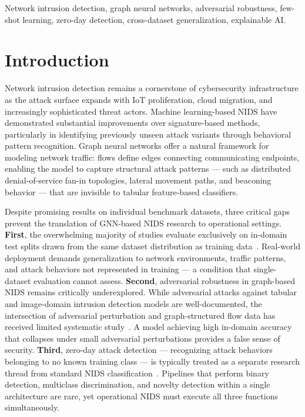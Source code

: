 \documentclass[compsoc,journal]{IEEEtran}
\begin{document}
\begin{keywords}
Network intrusion detection, graph neural networks, adversarial robustness, few-shot learning, zero-day detection, cross-dataset generalization, explainable AI.
\end{keywords}

\section{Introduction}

Network intrusion detection remains a cornerstone of cybersecurity infrastructure as the attack surface expands with IoT proliferation, cloud migration, and increasingly sophisticated threat actors. Machine learning-based NIDS have demonstrated substantial improvements over signature-based methods, particularly in identifying previously unseen attack variants through behavioral pattern recognition. Graph neural networks offer a natural framework for modeling network traffic: flows define edges connecting communicating endpoints, enabling the model to capture structural attack patterns — such as distributed denial-of-service fan-in topologies, lateral movement paths, and beaconing behavior — that are invisible to tabular feature-based classifiers.

Despite promising results on individual benchmark datasets, three critical gaps prevent the translation of GNN-based NIDS research to operational settings. \textbf{First}, the overwhelming majority of studies evaluate exclusively on in-domain test splits drawn from the same dataset distribution as training data~\cite{sarhan2021netflow,koroniotis2018botiot}. Real-world deployment demands generalization to network environments, traffic patterns, and attack behaviors not represented in training — a condition that single-dataset evaluation cannot assess. \textbf{Second}, adversarial robustness in graph-based NIDS remains critically underexplored. While adversarial attacks against tabular and image-domain intrusion detection models are well-documented, the intersection of adversarial perturbation and graph-structured flow data has received limited systematic study~\cite{arganids,structuraladv}. A model achieving high in-domain accuracy that collapses under small adversarial perturbations provides a false sense of security. \textbf{Third}, zero-day attack detection — recognizing attack behaviors belonging to no known training class — is typically treated as a separate research thread from standard NIDS classification~\cite{snell2017prototypical}. Pipelines that perform binary detection, multiclass discrimination, and novelty detection within a single architecture are rare, yet operational NIDS must execute all three functions simultaneously.
\end{document}
